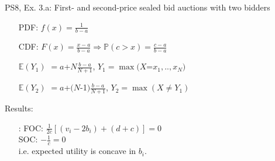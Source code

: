 \begin{frame}{PS8, Ex. 3.a: First- and second-price sealed bid auctions with two bidders}
\begin{multicols}{2}
\begin{enumerate}
        \item[PDF:] $f(x)=\frac{1}{b-a}$
        \item[CDF:] $F(x)=\frac{x-a}{b-a}\Rightarrow\mathbb{P}(c>x)=\frac{c-a}{b-a}$
        \item[$\mathbb{E}(Y_1)$] $=a$+$N\frac{b-a}{N+1}$, $Y_1=\max(X$=$x_1,..,x_N)$
        \item[$\mathbb{E}(Y_2)$] $=a$+$(N$-1$)\frac{b-a}{N+1}$, $Y_2=\max(X\neq Y_1)$
      \end{enumerate}
      \vspace{-6pt}
      Results:
      \vspace{-6pt}
      \begin{itemize}
        \item[\nth{2}:] FOC: $\frac{1}{2c}[(v_i-2b_i)+(d+c)]=0$\\
                        SOC: $-\frac{1}{c}=0$\\
                        i.e. expected utility is concave in $b_i$.
      \end{itemize}
      \vfill\null
    \end{multicols}
\end{frame}
